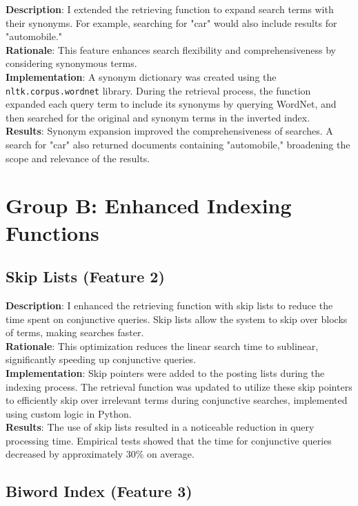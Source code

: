 \documentclass[a4paper,10pt]{article}
\begin{document}
\textbf{Description}: I extended the retrieving function to expand search terms with their synonyms. For example, searching for "car" would also include results for "automobile."\\
\textbf{Rationale}: This feature enhances search flexibility and comprehensiveness by considering synonymous terms.\\
\textbf{Implementation}: A synonym dictionary was created using the \texttt{nltk.corpus.wordnet} library. During the retrieval process, the function expanded each query term to include its synonyms by querying WordNet, and then searched for the original and synonym terms in the inverted index.\\
\textbf{Results}: Synonym expansion improved the comprehensiveness of searches. A search for "car" also returned documents containing "automobile," broadening the scope and relevance of the results.

\section{Group B: Enhanced Indexing Functions}

\subsection{Skip Lists (Feature 2)}

\textbf{Description}: I enhanced the retrieving function with skip lists to reduce the time spent on conjunctive queries. Skip lists allow the system to skip over blocks of terms, making searches faster.\\
\textbf{Rationale}: This optimization reduces the linear search time to sublinear, significantly speeding up conjunctive queries.\\
\textbf{Implementation}: Skip pointers were added to the posting lists during the indexing process. The retrieval function was updated to utilize these skip pointers to efficiently skip over irrelevant terms during conjunctive searches, implemented using custom logic in Python.\\
\textbf{Results}: The use of skip lists resulted in a noticeable reduction in query processing time. Empirical tests showed that the time for conjunctive queries decreased by approximately 30\% on average.

\subsection{Biword Index (Feature 3)}
\end{document}

